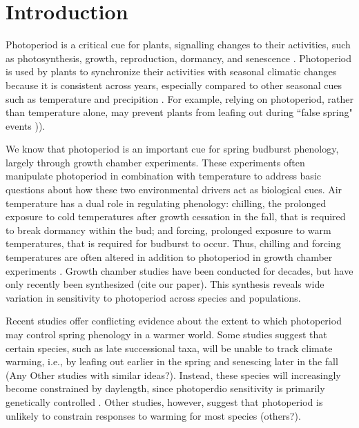 \documentclass{article}
\begin{document}
\section*{Introduction}
\par  Photoperiod is a critical cue for plants, signalling changes to their activities, such as photosynthesis, growth, reproduction, dormancy, and senescence \citep[e.g.,][]{Howe:1996,lagercrantz2009}. Photoperiod is used by plants to synchronize their activities with seasonal climatic changes \citep[e.g.,][]{Hsu:2011,Singh:2017,Basler:2012} because it is consistent across years, especially compared to other seasonal cues such as temperature and precipition \citep{saikkonen2012}. For example, relying on photoperiod, rather than temperature alone, may prevent plants from leafing out during ``false spring" events \citep[unusually warm periods during winter that are followed by a return of cold temperatures][] {Gu2008})). 
\par We know that photoperiod is an important cue for spring budburst phenology, largely through growth chamber experiments.  These experiments often manipulate photoperiod in combination with temperature to address basic questions about how these two environmental drivers act as biological cues. Air temperature has a dual role in regulating phenology: chilling, the prolonged exposure to cold temperatures after growth cessation in the fall, that is required to break dormancy within the bud; and forcing, prolonged exposure to warm temperatures, that is required for budburst to occur. Thus, chilling and forcing temperatures are often altered in addition to photoperiod in growth chamber experiments \citep[e.g.,][]{Campbell:1975aa,HEIDE:1977aa,Falusi:1990aa,Spann:2004aa,Laube:2014a}. Growth chamber studies have been conducted for decades, but have only recently been synthesized (cite our paper). This synthesis reveals wide variation in sensitivity to photoperiod across species and populations. 
\par Recent studies offer conflicting evidence %
about the extent to which photoperiod may control spring phenology in a warmer world. Some studies suggest that certain species, such as late successional taxa, will be unable to track climate warming, i.e., by leafing out earlier in the spring and senescing later in the fall \citep{koerner2010b} (Any Other studies with similar ideas?). Instead, these species will increasingly become constrained by daylength, since  photoperdio sensitivity is primarily genetically controlled \citep{koerner2010b}. Other studies, however, suggest that photoperiod is unlikely to constrain responses to warming for most species \citep{zohner2016} (others?).
 
\end{document}
